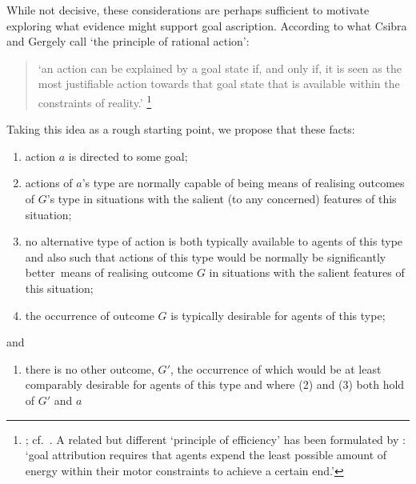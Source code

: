 \documentclass[12pt,a4paper]{extarticle}
\begin{document}
While not decisive,
these considerations are perhaps sufficient to motivate 
exploring what evidence might support goal ascription.
According to 
what Csibra and Gergely call `the principle of rational action':
%
\begin{quote}
`an action can be explained by a goal state if, and only if, it is seen as the most justifiable action towards that goal state that is available within the constraints of reality.'%
\footnote{
\citet[p.\ 255]{Csibra:1998cx}; cf.\ \citet{Csibra:2003jv}.
A related but different `principle of efficiency' has been formulated by \citet[p.\ 1061]{Southgate:2008el}:
`goal attribution requires that agents expend the least possible amount of energy within their motor constraints to achieve a certain end.'
}
\end{quote}
%
Taking this idea as a rough starting point,
we propose that
these facts:
%
\begin{enumerate}
%
\item action $a$ is directed to some goal;
%
\item actions of $a$'s type are normally capable of being means of realising outcomes of $G$'s type in situations with the salient (to any concerned) features of this situation;
% 
\item no alternative type of action is both 
typically available to agents of this type 
and also 
such that actions of this type would be normally be significantly better\footnotemark \ means of realising outcome $G$ in situations with the salient features of this situation;
%
\item the occurrence of outcome $G$ is typically desirable for agents of this type;
%
\end{enumerate}
%
and
%
\begin{enumerate}[resume]
\item there is no other outcome, $G'$, 
the occurrence of which would be at least comparably desirable for agents of this type 
and where (2) and (3) both hold of $G'$ and $a$
%
\end{enumerate}
\end{document}
